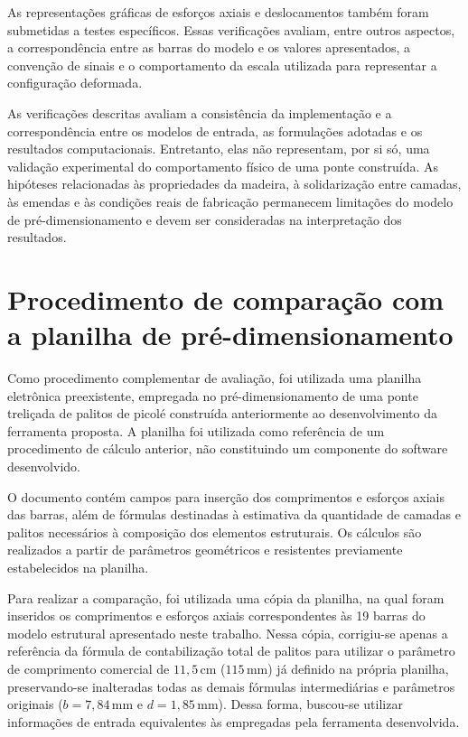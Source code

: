 As representações gráficas de esforços axiais e deslocamentos também foram submetidas a testes específicos. Essas verificações avaliam, entre outros aspectos, a correspondência entre as barras do modelo e os valores apresentados, a convenção de sinais e o comportamento da escala utilizada para representar a configuração deformada.

As verificações descritas avaliam a consistência da implementação e a correspondência entre os modelos de entrada, as formulações adotadas e os resultados computacionais. Entretanto, elas não representam, por si só, uma validação experimental do comportamento físico de uma ponte construída. As hipóteses relacionadas às propriedades da madeira, à solidarização entre camadas, às emendas e às condições reais de fabricação permanecem limitações do modelo de pré-dimensionamento e devem ser consideradas na interpretação dos resultados.

\section{Procedimento de comparação com a planilha de pré-dimensionamento}
\label{sec:metodologia-comparacao-planilha}

Como procedimento complementar de avaliação, foi utilizada uma planilha eletrônica preexistente, empregada no pré-dimensionamento de uma ponte treliçada de palitos de picolé construída anteriormente ao desenvolvimento da ferramenta proposta. A planilha foi utilizada como referência de um procedimento de cálculo anterior, não constituindo um componente do software desenvolvido.

O documento contém campos para inserção dos comprimentos e esforços axiais das barras, além de fórmulas destinadas à estimativa da quantidade de camadas e palitos necessários à composição dos elementos estruturais. Os cálculos são realizados a partir de parâmetros geométricos e resistentes previamente estabelecidos na planilha.

Para realizar a comparação, foi utilizada uma cópia da planilha, na qual foram inseridos os comprimentos e esforços axiais correspondentes às 19 barras do modelo estrutural apresentado neste trabalho. Nessa cópia, corrigiu-se apenas a referência da fórmula de contabilização total de palitos para utilizar o parâmetro de comprimento comercial de \(11,5\,\mathrm{cm}\) (\(115\,\mathrm{mm}\)) já definido na própria planilha, preservando-se inalteradas todas as demais fórmulas intermediárias e parâmetros originais (\(b = 7,84\,\mathrm{mm}\) e \(d = 1,85\,\mathrm{mm}\)). Dessa forma, buscou-se utilizar informações de entrada equivalentes às empregadas pela ferramenta desenvolvida.

